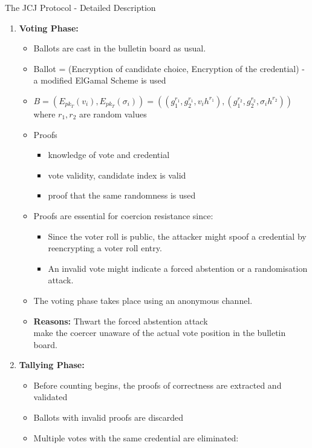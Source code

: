 \documentclass{beamer}
\begin{document}
\begin{frame}{The JCJ Protocol - Detailed Description}
\begin{enumerate}
\item \textbf{Voting Phase:}  
\begin{itemize}
	\item Ballots are cast in the bulletin board as usual.
	\item Ballot = (Encryption of candidate choice, Encryption of the credential) - a modified ElGamal Scheme is used
	\item $B = (E_{pk_T}(v_i),E_{pk_T}(\sigma_i)) = ((g_1^{r_1},g_2^{r_1},v_i h^{r_1}),(g_1^{r_2},g_2^{r_2},\sigma_i h^{r_2}))$ where $r_1,r_2$ are random values
	\item Proofs
	\begin{itemize}
		\item knowledge of vote and credential
		\item vote validity, candidate index is valid
		\item proof that the same randomness is used
	\end{itemize}
	\item Proofs are essential for coercion resistance since:
	\begin{itemize}
		\item Since the voter roll is public, the attacker might spoof a credential by reencrypting a voter roll entry.  
		\item An invalid vote might indicate a forced abstention or a randomisation attack.
	\end{itemize}
	\item The voting phase takes place using an anonymous channel.
	\item \textbf{Reasons:} Thwart the forced abstention attack \\
						    make the coercer unaware of the actual vote position in the bulletin board.
\end{itemize}

\framebreak

\item \textbf{Tallying Phase:} 
\begin{itemize}
\item Before counting begins, the proofs of correctness are extracted and validated
\item Ballots with invalid proofs are discarded
\item Multiple votes with the same credential are eliminated:


\end{itemize}
\end{enumerate}
\end{frame}
\end{document}
